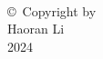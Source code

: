 

\thispagestyle{empty}
\hbox{\ }

\vfill
\renewcommand{\baselinestretch}{1}
\small\normalsize

\vspace{-.65in}

\begin{center}
\large{\copyright \hbox{ }Copyright by\\
Haoran Li  %
\\
2024}
\end{center}

\vfill